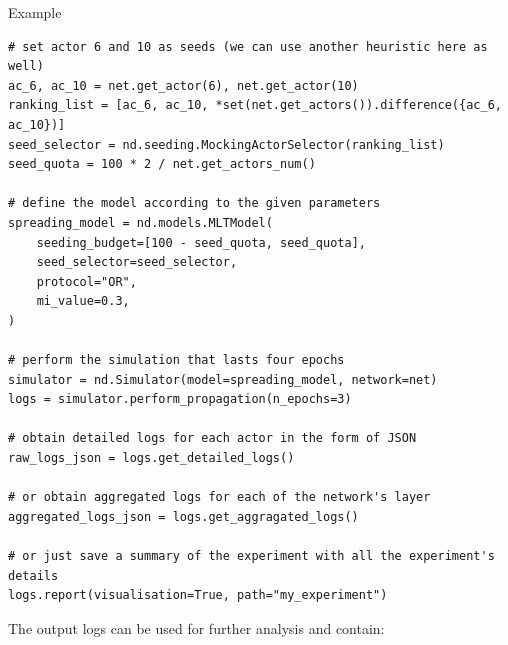 \documentclass[final]{beamer}
\newlength{\colwidth}
\begin{document}
\begin{frame}[t, fragile]
\begin{columns}[t]
\begin{column}{\colwidth}
\begin{exampleblock}{Example}
\begin{lstlisting}[style=py, basicstyle=\footnotesize\ttfamily]
# set actor 6 and 10 as seeds (we can use another heuristic here as well)
ac_6, ac_10 = net.get_actor(6), net.get_actor(10)
ranking_list = [ac_6, ac_10, *set(net.get_actors()).difference({ac_6, ac_10})]
seed_selector = nd.seeding.MockingActorSelector(ranking_list)
seed_quota = 100 * 2 / net.get_actors_num()

# define the model according to the given parameters
spreading_model = nd.models.MLTModel(
    seeding_budget=[100 - seed_quota, seed_quota],
    seed_selector=seed_selector,
    protocol="OR",
    mi_value=0.3,  
)

# perform the simulation that lasts four epochs
simulator = nd.Simulator(model=spreading_model, network=net)
logs = simulator.perform_propagation(n_epochs=3)

# obtain detailed logs for each actor in the form of JSON
raw_logs_json = logs.get_detailed_logs()

# or obtain aggregated logs for each of the network's layer
aggregated_logs_json = logs.get_aggragated_logs()

# or just save a summary of the experiment with all the experiment's details
logs.report(visualisation=True, path="my_experiment")
\end{lstlisting}


The output logs can be used for further analysis and contain:


\end{exampleblock}
\end{column}
\end{columns}
\end{frame}
\end{document}
